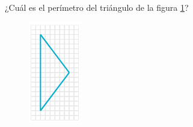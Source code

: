 
¿Cuál es el perímetro del triángulo de la figura \ref{fig:peri_isos_03}?
\begin{figure}[H]
    \begin{center}
        \includegraphics[width=0.2\textwidth]{../images/peri_isos_03.png}
    \end{center}
    \caption{}
    \label{fig:peri_isos_03}
\end{figure}